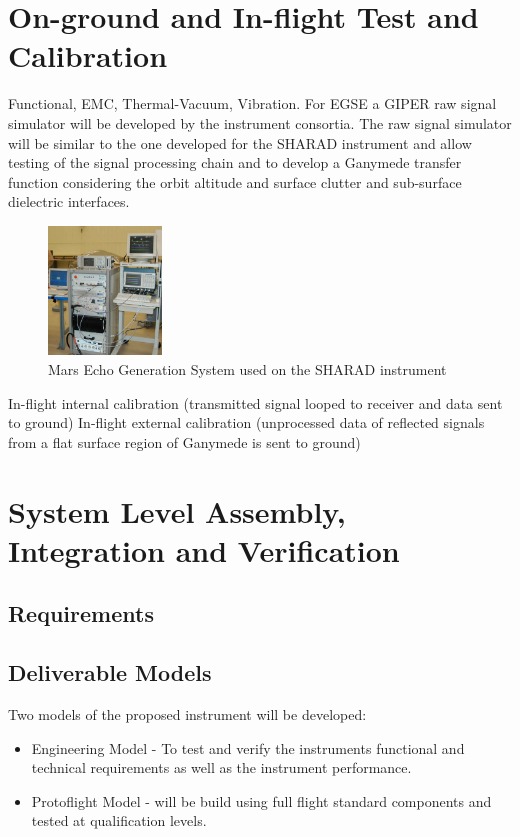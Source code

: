 \section{On-ground and In-flight Test and Calibration}
%
Functional, EMC, Thermal-Vacuum, Vibration.
%
%
For \ac{EGSE} a \ac{GIPER} raw signal simulator will be developed by the instrument consortia. The raw signal simulator will be similar to the one developed for the \ac{SHARAD} instrument\cite{Giovanni} and allow testing of the signal processing chain and to develop a Ganymede transfer function considering the orbit altitude and surface clutter and sub-surface dielectric interfaces. 
%
%
\begin{figure}
\centering
\includegraphics[width=0.27\textwidth]{figures/MEGS}
\caption[caption]{Mars Echo Generation System used on the SHARAD instrument\cite{MEGS}}
\label{fig:MEGS}
\end{figure}
%
%
In-flight internal calibration (transmitted signal looped to receiver and data sent to ground)
In-flight external calibration (unprocessed data of reflected signals from a flat surface region of Ganymede is sent to ground)
%
%
\section{System Level Assembly, Integration and Verification}
%
%
\subsection{Requirements}
\subsection{Deliverable Models}
%
Two models of the proposed instrument will be developed:
\begin{itemize}
\item Engineering Model - To test and verify the instruments functional and technical requirements as well as the instrument performance.\\
\item Protoflight Model - will be build using full flight standard components and tested at qualification levels.
\end{itemize}
%
